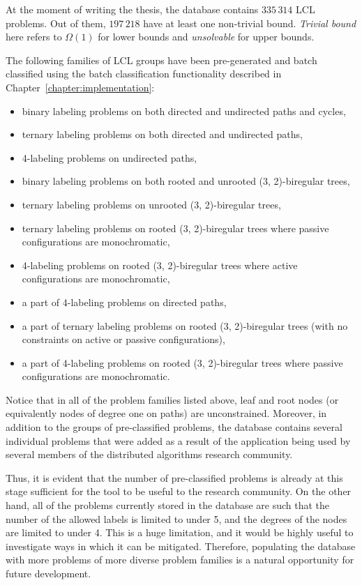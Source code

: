 At the moment of writing the thesis, the database contains $335\,314$
LCL problems. Out of them, $197\,218$ have at least one non-trivial bound. \emph{Trivial bound} here
refers to $\Omega(1)$ for lower bounds and \emph{unsolvable} for upper bounds.

The following families of LCL groups have been pre-generated and batch classified
using the batch classification functionality described in Chapter~\ref{chapter:implementation}:

\begin{itemize}
  \item binary labeling problems on both directed and undirected paths and cycles,
  \item ternary labeling problems on both directed and undirected paths,
  \item 4-labeling problems on undirected paths,
  \item binary labeling problems on both rooted and unrooted (3, 2)-biregular trees,
  \item ternary labeling problems on unrooted (3, 2)-biregular trees,
  \item ternary labeling problems on rooted (3, 2)-biregular trees where passive configurations are monochromatic,
  \item 4-labeling problems on rooted (3, 2)-biregular trees where active configurations are monochromatic,
  \item a part of 4-labeling problems on directed paths,
  \item a part of ternary labeling problems on rooted (3, 2)-biregular trees (with no constraints on active or passive configurations),
  \item a part of 4-labeling problems on rooted (3, 2)-biregular trees where passive configurations are monochromatic.
\end{itemize}
Notice that in all of the problem families listed above, leaf and root nodes
(or equivalently nodes of degree one on paths) are unconstrained. Moreover, in addition to the
groups of pre-classified problems, the database contains several individual problems that
were added as a result of the application being used by several
members of the
distributed algorithms research community.

Thus, it is evident that the number of pre-classified problems is already at this stage sufficient
for the tool to be useful to the research community.
On the other hand, all of the problems currently stored in the database are such
that the number of the allowed labels is limited to under 5,
and the degrees of the nodes
are limited to under 4. This is a huge limitation, and it would be
highly useful to investigate ways in which it can be mitigated.
Therefore, populating the database
with more problems of more diverse problem families is a natural opportunity for future
development.

